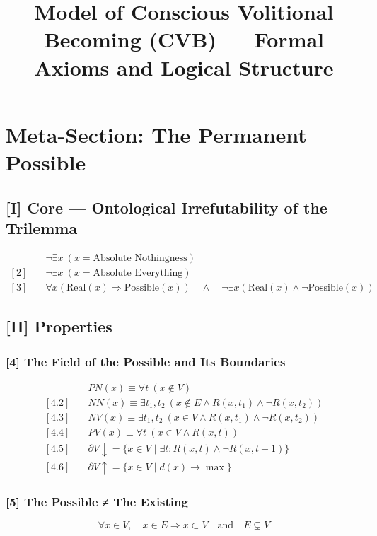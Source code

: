 \documentclass[12pt]{article}
\title{Model of Conscious Volitional Becoming (CVB) — Formal Axioms and Logical Structure}
\author{}
\date{}
\begin{document}
\maketitle

\section*{Meta-Section: The Permanent Possible}

\subsection*{[I] Core — Ontological Irrefutability of the Trilemma}
\begin{align*}
[1] & \quad \neg\exists x\ (x = \text{Absolute Nothingness}) \\
[2] & \quad \neg\exists x\ (x = \text{Absolute Everything}) \\
[3] & \quad \forall x\left(\text{Real}(x) \Rightarrow \text{Possible}(x)\right) \quad\land\quad \neg\exists x\left(\text{Real}(x) \land \neg\text{Possible}(x)\right)
\end{align*}

\subsection*{[II] Properties}

\subsubsection*{[4] The Field of the Possible and Its Boundaries}
\begin{align*}
[4.1] & \quad PN(x) \equiv \forall t\ (x \notin V) \\
[4.2] & \quad NN(x) \equiv \exists t_1, t_2\ (x \notin E \land R(x,t_1) \land \neg R(x,t_2)) \\
[4.3] & \quad NV(x) \equiv \exists t_1, t_2\ (x \in V \land R(x,t_1) \land \neg R(x,t_2)) \\
[4.4] & \quad PV(x) \equiv \forall t\ (x \in V \land R(x,t)) \\
[4.5] & \quad \partial V\downarrow = \{x \in V \mid \exists t: R(x,t) \land \neg R(x,t+1)\} \\
[4.6] & \quad \partial V\uparrow = \{x \in V \mid d(x) \rightarrow \max\}
\end{align*}

\subsubsection*{[5] The Possible ≠ The Existing}
\[
\forall x \in V,\quad x \in E \Rightarrow x \subset V\quad \text{and} \quad E \subsetneq V
\]
\end{document}
